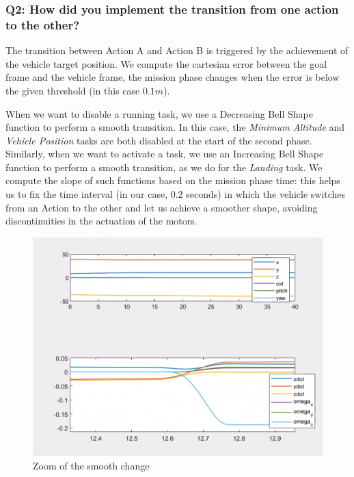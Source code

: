 \documentclass{article}
\begin{document}



\subsubsection{Q2: How did you implement the transition from one action to the other?}

The transition between Action A and Action B is triggered by the achievement of the vehicle target position. We compute the cartesian error between the goal frame and the vehicle frame, the mission phase changes when the error is below the given threshold (in this case $0.1m$). 

When we want to disable a running task, we use a Decreasing Bell Shape function to perform a smooth transition. In this case, the \textit{Minimum Altitude} and \textit{Vehicle Position} tasks are both disabled at the start of the second phase. Similarly, when we want to activate a task, we use an Increasing Bell Shape function to perform a smooth transition, as we do for the \textit{Landing} task. 
We compute the slope of such functions based on the mission phase time: this helps us to fix the time interval (in our case, $0.2$ seconds) in which the vehicle switches from an Action to the other and let us achieve a smoother shape, avoiding discontinuities in the actuation of the motors.
\begin{figure}[!htb]
    \centering
    \includegraphics[scale=0.25]{222_smooth_ppdot.png}
    \caption{Zoom of the smooth change}
    \label{images_2_3_1}
\end{figure}
\end{document}
